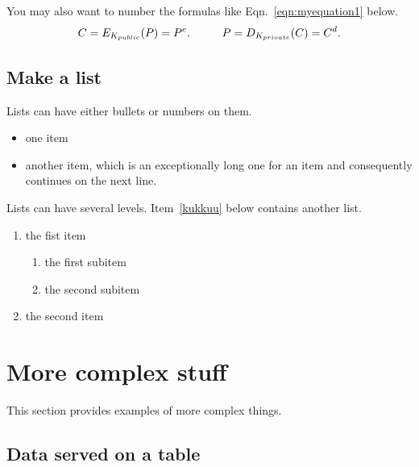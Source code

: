 \documentclass[a4paper,12pt]{article}
\begin{document}
You may also want to number the formulas like Eqn.~\ref{eqn:myequation1}
below.
\begin{equation}\label{eqn:myequation1}
C = E_{K_{public}}(P) = P^e. \hspace{10mm}   P = D_{K_{private}}(C) = C^d.
\end{equation}





\subsection{Make a list}\label{sec:list}

Lists can have either bullets or numbers on them. 

\begin{itemize}
\item one item
\item another item, which is an exceptionally long one for an item
  and consequently continues on the next line.
\end{itemize}

Lists can have several levels. Item~\ref{kukkuu} below contains
another list.
\begin{enumerate}
\item the fist item \label{kukkuu}
  \begin{enumerate}
  \item the first subitem 
  \item the second subitem
  \end{enumerate}
\item the second item
\end{enumerate}




\pagebreak[3]
\section{More complex stuff}

This section provides examples of more complex things. \cite{opengles_kronos}  




\subsection{Data served on a table}
\end{document}
